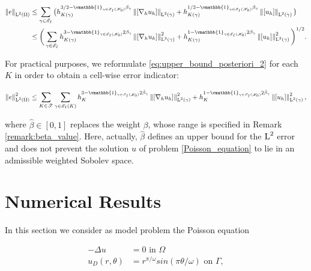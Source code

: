 \documentclass[a4paper,11pt]{article}
\begin{document}
 \begin{equation}
        \begin{split}
    \Norm{e}_{\leb{2}(\Omega)} &\leq  \sum_{\gamma \in \cE_{I}}  \big(h_{K(\gamma)}^{3/2 -  \vmathbb{1}_{\gamma \in \cE_{I}(\cK_{0})}\beta_{\gamma}} \Norm{\jump{\nabla_{h} u_{h}}}_{\leb{2}(\gamma)} + h_{K(\gamma)}^{1/2 - \vmathbb{1}_{\gamma \in \cE_{I}(\cK_{0})}\beta_{\gamma}} \Norm{\jump{u_{h}}}_{\leb{2}(\gamma)}\big)\\
    & \leq \bigg( \sum_{\gamma \in \cE_{I}}  h_{K(\gamma)}^{3 - \vmathbb{1}_{\gamma \in \cE_{I}(\cK_{0})}2\beta_{\gamma}} \Norm{\jump{\nabla_{h} u_{h}}}^2_{\leb{2}(\gamma)} + h_{K(\gamma)}^{1 - \vmathbb{1}_{\gamma \in \cE_{I}(\cK_{0})}2\beta_{\gamma}}\Norm{\jump{u_{h}}}^2_{\leb{2}(\gamma)}\bigg)^{1/2}.
    \end{split}
    \label{eq:upper_bound_posteriori_2}
\end{equation}

For practical purposes, we reformulate \eqref{eq:upper_bound_posteriori_2} for each $K$ in order to obtain a cell-wise error indicator:

 \begin{equation}
      \Norm{e}_{\leb{2}(\W)}^{2} \leq \sum_{K \in \T{}} \sum_{\gamma \in \cE_{I}(K)}  h_{K}^{3 - \vmathbb{1}_{\gamma \in \cE_{I}(\cK_{0})}2\hat{\beta}_{\gamma}} \Norm{\jump{\nabla_{h} u_{h}}}^2_{\leb{2}(\gamma)} + h_{K}^{1 - \vmathbb{1}_{\gamma \in \cE_{I}(\cK_{0})}2\hat{\beta}_{\gamma}}\Norm{\jump{u_{h}}}^2_{\leb{2}(\gamma)},
    \label{eq:upper_bound_posteriori_cell}
\end{equation}

where $\hat{\beta} \in [0,1]$ replaces the weight $\beta$, whose range is specified in Remark \ref{remark:beta_value}. Here, actually, $\hat{\beta}$ defines an upper bound for the $\operatorname L^{2}$ error and does not prevent the solution $u$ of problem \ref{Poisson_equation} to lie in an admissible weighted Sobolev space.


\section{Numerical Results}
\label{sec:Numerical_results}
In this section we consider as model problem the Poisson equation

\begin{equation}
    \begin{split}
        - \Delta u &= 0 \text{ in } \Omega\\
        u_{D}(r,\theta) &= r^{\pi/\omega} sin\left(\pi\theta / \omega \right) \text{ on } \Gamma,
    \end{split}
\label{eq:poisson_corner}
\end{equation}
\end{document}
